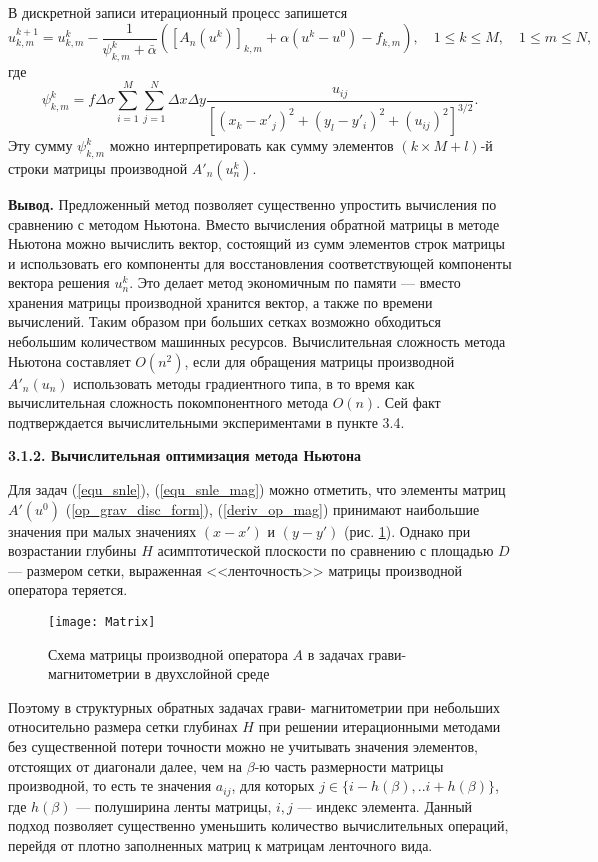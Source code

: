 В дискретной записи итерационный процесс запишется
$$u_{k,m}^{k+1}=u_{k,m}^k-\frac{1}{\psi_{k,m}^k+\bar\alpha}([A_n(u^k)]_{k,m} + \alpha(u^k-u^0) -f_{k,m}),\quad 1\le k \le M, \quad 1\le m \le N,$$
где $$\psi_{k,m}^k=f\Delta\sigma\sum\limits_{i=1}^{M}\sum\limits_{j=1}^{N}
\Delta x\Delta y\frac{u_{ij}}{[(x_k-x'_j)^2+(y_l-y'_i)^2+(u_{ij})^2]^{3/2}}.$$
Эту сумму $\psi_{k,m}^k$ можно интерпретировать как сумму элементов $(k\times M + l)$-й строки матрицы производной $A'_n(u_n^k)$.

{\bfseries\large Вывод.} Предложенный метод позволяет существенно упростить вычисления по сравнению с методом Ньютона. Вместо вычисления обратной матрицы в методе Ньютона можно вычислить вектор, состоящий из сумм элементов строк матрицы и использовать его компоненты для восстановления соответствующей компоненты вектора решения $u_n^k$. Это делает метод экономичным по памяти --- вместо хранения матрицы производной хранится вектор, а также по времени вычислений. Таким образом при больших сетках возможно обходиться небольшим количеством машинных ресурсов. Вычислительная сложность метода Ньютона составляет $O(n^2)$, если для обращения матрицы производной $A'_n(u_n)$ использовать методы градиентного типа, в то время как вычислительная сложность покомпонентного метода $O(n)$. Сей факт подтверждается вычислительными экспериментами в пункте 3.4.

\smallskip
{\bfseries 3.1.2. Вычислительная оптимизация метода Ньютона}

Для задач (\ref{equ_snle}), (\ref{equ_snle_mag}) можно отметить, что элементы матриц $A'(u^0)$ (\ref{op_grav_disc_form}), (\ref{deriv_op_mag}) принимают наибольшие значения при малых значениях $(x-x')$ и $(y-y')$ (рис. \ref{fig:matrixscheme}).
Однако при возрастании глубины $H$ асимптотической плоскости по сравнению с площадью $D$ --- размером сетки, выраженная <<ленточность>> матрицы производной оператора теряется.
\begin{figure}[H]
	\centering
	\texttt{[image: Matrix]}
	\caption{Схема матрицы производной оператора $A$ в задачах грави- магнитометрии в двухслойной среде}
	\label{fig:matrixscheme}
\end{figure}

Поэтому в структурных обратных задачах грави- магнитометрии при небольших относительно размера сетки глубинах $H$ при решении итерационными методами без существенной потери точности можно не учитывать значения элементов, отстоящих от диагонали далее, чем на  $\beta$-ю часть  размерности матрицы производной, то есть те значения $a_{ij}$, для которых  $j \in \{i-h(\beta),..i+h(\beta)\} $, где $h(\beta)$ --- полуширина ленты матрицы, $i, j$ --- индекс элемента. Данный подход позволяет существенно уменьшить количество вычислительных операций, перейдя от плотно заполненных матриц к матрицам ленточного вида.

